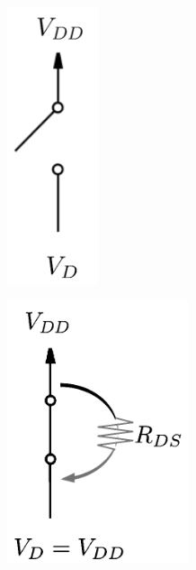 \documentclass[12pt,openany]{book}
\begin{document}
			      		\begin{minipage}{0.45\textwidth}		      			
							\begin{center}
								\includegraphics[width=0.2\textwidth]{circuits/9.1.2_2.png}
							\end{center} %
							\begin{center}
							\includegraphics[width=0.4\textwidth]{circuits/9.1.2_3.png} %
							\end{center}			      		
\end{minipage}
			      		    
			      	    
			      	
			      	\newpage
\end{document}
